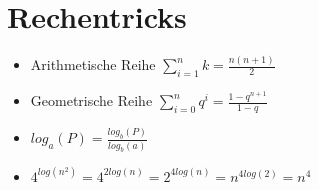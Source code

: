 \documentclass{article}
\begin{document}
\section{Rechentricks}
\begin{itemize}
\item Arithmetische Reihe $\sum_{i=1}^n k  = \frac{n(n+1)}{2} $
\item Geometrische Reihe $\sum_{i=0}^n q^i = \frac{1-q^{n+1}}{1-q}$
\item $log_a(P) = \frac{log_b(P)}{log_b(a)}$
\item $4^{log(n^2)} = 4^{2log(n)} =2^{4log(n)} = n^{4log(2)} = n^4 $




\end{itemize}
\end{document}
